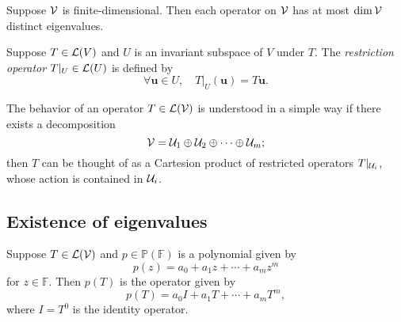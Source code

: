 \begin{lem}
  Suppose ${\cal V}$ is finite-dimensional.
  Then each operator on ${\cal V}$ has at most $\dim {\cal V}$ distinct eigenvalues.
\end{lem}

\begin{defn}
  \label{def:restrictedLinearOp}
  Suppose $T\in{\cal L}(V)$ and $U$ is an invariant subspace of $V$
  under $T$.
  The \emph{restriction operator} $T|_U\in {\cal L}(U)$
  is defined by
  \begin{equation}
    \label{eq:restrictedLinearOp}
    \forall \mathbf{u}\in U,\quad T|_U (\mathbf{u}) = T\mathbf{u}.
  \end{equation}
\end{defn}

\begin{rem}
  The behavior of an operator $T\in {\cal L}({\cal V})$
  is understood in a simple way
  if there exists a decomposition
  \begin{displaymath}
    {\cal V} = {\cal U}_1 \oplus {\cal U}_2 \oplus \cdots \oplus {\cal U}_m;
  \end{displaymath}
  then $T$ can be thought of as a Cartesion product 
  of restricted operators
  $T|_{{\cal U}_i}$, whose action is contained in ${\cal U}_i$.
\end{rem}

\subsection{Existence of eigenvalues}

\begin{ntn}
  \label{ntn:polyOfAnOp}
  Suppose $T\in {\cal L}({\cal V})$ and $p\in \mathbb{P}(\mathbb{F})$
  is a polynomial given by
  \begin{displaymath}
    p(z) = a_0 + a_1 z + \cdots + a_m z^m
  \end{displaymath}
  for $z\in \mathbb{F}$.
  Then $p(T)$ is the operator given by
  \begin{displaymath}
    p(T) = a_0I + a_1 T + \cdots + a_m T^m,
  \end{displaymath}
  where $I=T^0$ is the identity operator.
\end{ntn}


